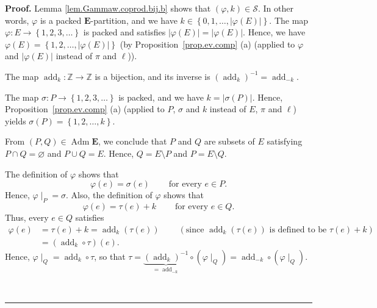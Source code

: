 \documentclass[numbers=enddot,12pt,final,onecolumn,notitlepage,abstracton]{scrartcl}
\theoremstyle{definition}
\newenvironment{proof}[1][Proof]{\noindent\textbf{#1.} }{\ \rule{0.5em}{0.5em}}
\newenvironment{verlong}{}{}
\newcommand{\Adm}{\operatorname{Adm}}
\newcommand{\EE}{{\mathbf{E}}}
\begin{document}
\begin{verlong}
\begin{proof}
Lemma \ref{lem.Gammaw.coprod.bij.b} shows that $\left(  \varphi,k\right)
\in\mathcal{S}$. In other words, $\varphi$ is a packed $ \EE %
$-partition, and we have $k\in\left\{  0,1,\ldots,\left\vert \varphi\left(
E\right)  \right\vert \right\}  $.
The map $\varphi : E \to \left\{ 1, 2, 3, \ldots \right\}$ is packed
and satisfies
$\left\vert \varphi\left( E\right) \right\vert
= \left\vert \varphi\left( E\right) \right\vert $.
Hence, we have
$\varphi \left( E \right)
= \left\{ 1, 2, \ldots, \left\vert \varphi\left( E\right)
            \right\vert \right\}$
(by Proposition~\ref{prop.ev.comp} (a) (applied to $\varphi$ and
$\left| \varphi\left(E\right) \right|$
instead of $\pi$ and $\ell$)).

The map $\operatorname{add}_{k}:\mathbb{Z}\rightarrow\mathbb{Z}$ is
a bijection, and its inverse is $\left(  \operatorname{add}_{k}%
\right)  ^{-1}=\operatorname{add}_{-k}$.

The map $\sigma : P \to \left\{ 1, 2, 3, \ldots \right\}$ is packed,
and we have
$k = \left\vert \sigma\left(  P\right)  \right\vert$.
Hence, Proposition~\ref{prop.ev.comp} (a) (applied to $P$, $\sigma$ and
$k$ instead of $E$, $\pi$ and $\ell$)
yields $\sigma\left(  P\right) = \left\{ 1,2,\ldots,k\right\}  $.

From $\left(  P,Q\right)  \in \Adm \EE$, we conclude that
$P$ and $Q$ are subsets of $E$ satisfying $P\cap Q=\varnothing$ and $P\cup
Q=E$. Hence, $Q=E\setminus P$ and $P=E\setminus Q$.

The definition of $\varphi$ shows that%
\begin{equation}
\varphi\left(  e\right)  =\sigma\left(  e\right)
\ \ \ \ \ \ \ \ \ \ \text{for every }e\in P.
\label{pf.lem.Gammaw.coprod.bij.c.1}%
\end{equation}
Hence, $\varphi\mid_{P}=\sigma$. Also, the definition of $\varphi$ shows that%
\begin{equation}
\varphi\left(  e\right)  =\tau\left(  e\right)
+k\ \ \ \ \ \ \ \ \ \ \text{for every }e\in Q.
\label{pf.lem.Gammaw.coprod.bij.c.2}%
\end{equation}
Thus, every $e\in Q$ satisfies%
\begin{align}
\varphi\left(  e\right)   &  =\tau\left(  e\right)  +k
= \operatorname{add}_{k}\left(  \tau\left(  e\right)  \right)
\ \ \ \ \ \ \ \ \ \ \left(  \text{since }\operatorname{add}_{k}%
\left(  \tau\left(  e\right)  \right)  \text{ is defined to be }\tau\left(
e\right)  +k\right) \nonumber\\
&  =\left(  \operatorname{add}_{k}\circ\tau\right)  \left(
e\right)  . \label{pf.lem.Gammaw.coprod.bij.c.2b}%
\end{align}
Hence, $\varphi\mid_{Q}=\operatorname{add}_{k}\circ\tau$, so that
$\tau=\underbrace{\left(  \operatorname{add}_{k}\right)  ^{-1}%
}_{=\operatorname{add}_{-k}}\circ\left(  \varphi\mid_{Q}\right)
=\operatorname{add}_{-k}\circ\left(  \varphi\mid_{Q}\right)  $.


\end{proof}
\end{verlong}
\end{document}
